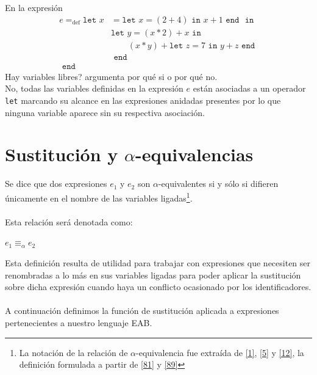     \begin{exercise}
        En la expresión
	 \begin{align*}
    	e=_{\text{def}}\texttt{let  }
    		x&= \texttt{let }x = (2 + 4) \texttt{ in } x+1 \texttt{ end }
    		\texttt{ in }\\
    		 &\texttt{let }y=(x \ast 2)+x 
    		 	\texttt{ in } \\
    		 & \qquad(x\ast y) + \texttt{let }z=7 \texttt{ in } 
    		 						y+z 
    		 				\texttt{ end }\\
    		 &\texttt{ end }\\
    	\texttt{ end }&
    \end{align*}
 	Hay variables libres? argumenta por qué si o por qué no. \\
    
        No, todas las variables definidas en la expresión $e$ están asociadas a un operador \texttt{let} marcando su alcance en las expresiones anidadas presentes por lo que ninguna variable aparece sin su respectiva asociación.
    \end{exercise}

\section{Sustitución y $\alpha$-equivalencias}
    \begin{definition} Se dice que dos expresiones $e_1$ y $e_2$ son $\alpha$-equivalentes si y sólo si difieren únicamente en el nombre de las variables ligadas\footnote{La notación de la relación de $\alpha$-equivalencia fue extraída de \hyperlink{1}{[1]}, \hyperlink{5}{[5]} y \hyperlink{12}{[12]}, la definición formulada a partir de \hyperlink{81}{[81]} y \hyperlink{89}{[89]}}.\\\\
    Esta relación será denotada como: 
    \begin{center}
            $e_1\equiv_\alpha e_2$        
    \end{center}
    \end{definition}

    Esta definición resulta de utilidad para trabajar con expresiones que necesiten ser renombradas a lo más en sus variables ligadas para poder aplicar la sustitución sobre dicha expresión cuando haya un conflicto ocasionado por los identificadores. \\\\
    A continuación definimos la función de sustitución aplicada a expresiones pertenecientes a nuestro lenguaje \textsf{EAB}.

